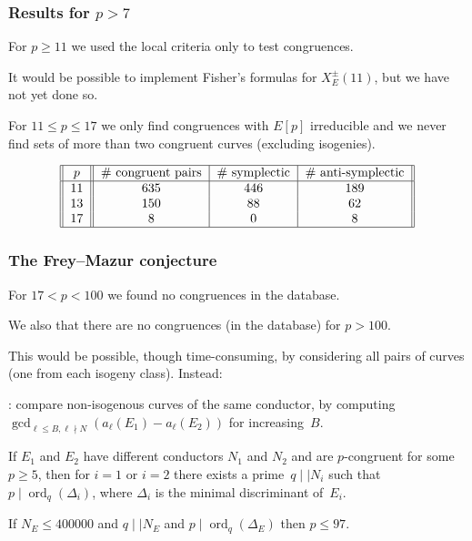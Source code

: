 \documentclass[handout]{beamer}
\DeclareMathOperator{\ord}{ord}
\newcommand{\high}[1]{\emph{\color{blue}{#1}}}
\begin{document}
\begin{frame}\frametitle{Results for $p>7$}
For $p\ge11$ we used the local criteria only to test congruences.

It would be possible to implement Fisher's formulas for
$X_E^{\pm}(11)$, but we have not yet done so.

For $11\le p\le 17$ we only find congruences with $E[p]$ irreducible
and we never find sets of more than two congruent curves (excluding
isogenies).


  \[
  \begin{tabular}{||c||c|c|c||}
    \hline
    $p$ & \# congruent pairs & \# symplectic & \# anti-symplectic\\
    \hline
    11 & 635 & 446 & 189 \\
    13 & 150 & 88 & 62 \\
    17 & 8 & 0 & 8 \\
    \hline
  \end{tabular}
  \]
\end{frame}

\begin{frame}\frametitle{The Frey--Mazur conjecture}
  For $17 < p < 100$ we found no congruences in the database.

  We also \high{proved} that there are no congruences (in the
  database) for $p>100$.

  This would be possible, though time-consuming, by considering all
  pairs of curves (one from each isogeny class). Instead:

  \medskip\pause

  \high{First}: compare non-isogenous curves of the same conductor, by
  computing $\gcd_{\ell\le B, \ell\nmid
    N}(a_{\ell}(E_1)-a_{\ell}(E_2))$ for increasing~$B$.

  \medskip\pause

  \begin{lemma}
    If $E_1$ and $E_2$ have different conductors $N_1$ and $N_2$
  and are $p$-congruent for some $p\ge5$, then for $i=1$ or $i=2$ there exists a
  prime~$q\mid\mid N_i$ such that $p\mid\ord_q(\Delta_i)$, where
  $\Delta_i$ is the minimal discriminant of~$E_i$.
  \end{lemma}
  \begin{lemma}
  If $N_E\le 400000$ and $q\mid\mid N_E$ and $p\mid\ord_q(\Delta_E)$
  then $p\le97$.
  \end{lemma}
\end{frame}
\end{document}
